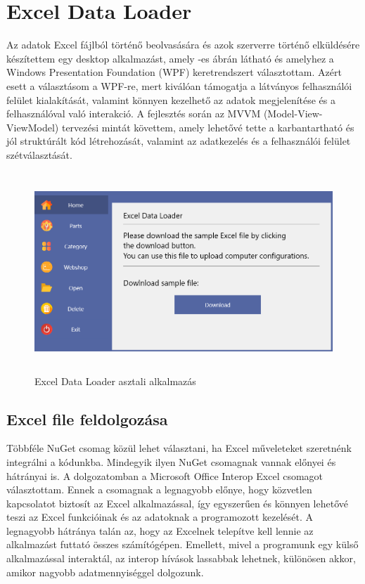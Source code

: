 \documentclass[
]{thesis-ekf}
\theoremstyle{definition}
\theoremstyle{remark}
\begin{document}
\section{Excel Data Loader \cite{WPFCSHARP}}
Az adatok Excel fájlból történő beolvasására és azok szerverre történő elküldésére készítettem egy desktop alkalmazást, amely -es ábrán látható és amelyhez a Windows Presentation Foundation (WPF) keretrendszert választottam. Azért esett a választásom a WPF-re, mert kiválóan támogatja a látványos felhasználói felület kialakítását, valamint könnyen kezelhető az adatok megjelenítése és a felhasználóval való interakció. A fejlesztés során az MVVM (Model-View-ViewModel) tervezési mintát követtem, amely lehetővé tette a karbantartható és jól struktúrált kód létrehozását, valamint az adatkezelés és a felhasználói felület szétválasztását. 
\begin{figure}[!ht]
	\centering
	\includegraphics[width=15cm, height=7.5cm]{ExcelDataLoader}
	\caption{Excel Data Loader asztali alkalmazás}
	\label{picture-ExcelDataLoader}
\end{figure}
\subsection{Excel file feldolgozása}

Többféle NuGet csomag közül lehet választani, ha Excel műveleteket szeretnénk integrálni a kódunkba. Mindegyik ilyen NuGet csomagnak vannak előnyei és hátrányai is. A dolgozatomban a Microsoft Office Interop Excel csomagot választottam. Ennek a csomagnak a legnagyobb előnye, hogy közvetlen kapcsolatot biztosít az Excel alkalmazással, így egyszerűen és könnyen lehetővé teszi az Excel funkcióinak és az adatoknak a programozott kezelését. A legnagyobb hátránya talán az, hogy az Excelnek telepítve kell lennie az alkalmazást futtató összes számítógépen. Emellett, mivel a programunk egy külső alkalmazással interaktál, az interop hívások lassabbak lehetnek, különösen akkor, amikor nagyobb adatmennyiséggel dolgozunk. 
\end{document}
